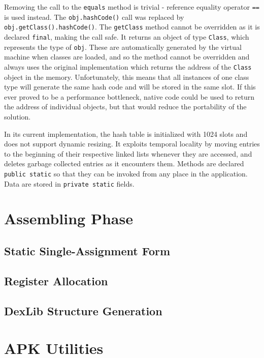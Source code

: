 \documentclass[12pt,twoside,notitlepage]{report}
\begin{document}
Removing the call to the \verb$equals$ method is trivial - reference equality operator \verb$==$ is used instead. The \verb$obj.hashCode()$ call was replaced by \verb$obj.getClass().hashCode()$. The \verb$getClass$ method cannot be overridden as it is declared \verb$final$, making the call safe. It returns an object of type \verb$Class$, which represents the type of \verb$obj$. These are automatically generated by the virtual machine when classes are loaded, and so the method cannot be overridden and always uses the original implementation which returns the address of the \verb$Class$ object in the memory. Unfortunately, this means that all instances of one class type will generate the same hash code and will be stored in the same slot. If this ever proved to be a performance bottleneck, native code could be used to return the address of individual objects, but that would reduce the portability of the solution. 

In its current implementation, the hash table is initialized with 1024 slots and does not support dynamic resizing. It exploits temporal locality by moving entries to the beginning of their respective linked lists whenever they are accessed, and deletes garbage collected entries as it encounters them. Methods are declared \verb$public static$ so that they can be invoked from any place in the application. Data are stored in \verb$private static$ fields.

\section{Assembling Phase}

\subsection{Static Single-Assignment Form}

\subsection{Register Allocation}

\subsection{DexLib Structure Generation}

\section{APK Utilities}
\end{document}
